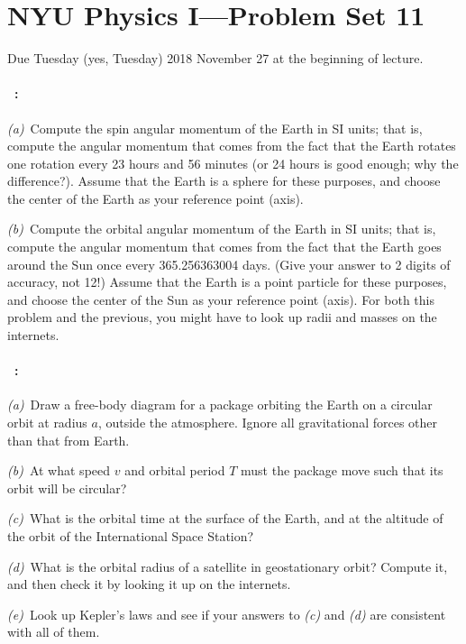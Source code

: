 \documentclass[12pt]{article}
\begin{document}
\section*{NYU Physics I---Problem Set 11}

Due Tuesday (yes, Tuesday) 2018 November 27 at the beginning of lecture.

\paragraph{\problemname~\theproblem:}%
\textsl{(a)}~Compute the spin angular momentum of the Earth in SI
units; that is, compute the angular momentum that comes from the fact
that the Earth rotates one rotation every 23 hours and 56 minutes (or
24 hours is good enough; why the difference?). Assume that the Earth
is a sphere for these purposes, and choose the center of the Earth as
your reference point (axis).

\textsl{(b)}~Compute the orbital angular momentum of the Earth in SI
units; that is, compute the angular momentum that comes from the fact
that the Earth goes around the Sun once every 365.256363004
days. (Give your answer to 2 digits of accuracy, not 12!) Assume that
the Earth is a point particle for these purposes, and choose the
center of the Sun as your reference point (axis). For both this
problem and the previous, you might have to look up radii and masses
on the internets.

\paragraph{\problemname~\theproblem:}\label{package}%
\textsl{(a)}~Draw a free-body diagram for a package orbiting the Earth
on a circular orbit at radius $a$, outside the atmosphere. Ignore all
gravitational forces other than that from Earth.

\textsl{(b)}~At what speed $v$ and orbital period $T$ must the package
move such that its orbit will be circular?

\textsl{(c)}~What is the orbital time at the surface of the Earth, and
at the altitude of the orbit of the International Space Station?

\textsl{(d)}~What is the orbital radius of a satellite in geostationary
orbit? Compute it, and then check it by looking it up on the internets.

\textsl{(e)}~Look up Kepler's laws and see if your answers to
\textsl{(c)} and \textsl{(d)} are consistent with all of them.
\end{document}
